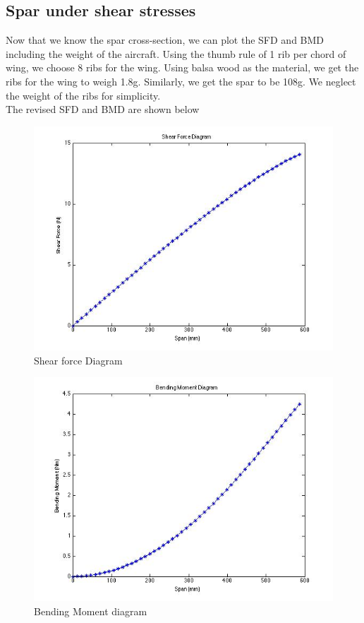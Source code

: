 \subsection{Spar under shear stresses}
Now that we know the spar cross-section, we can plot the SFD and BMD including the weight of the aircraft. 
Using the thumb rule of 1 rib per chord of wing, we choose 8 ribs for the wing. Using balsa wood as the material, we get the ribs for the wing to weigh 1.8g. Similarly, we get the spar to be 108g. We neglect the weight of the ribs for simplicity. 
\\
The revised SFD and BMD are shown below
\begin{figure}[H]
    \begin{center}
      \includegraphics[width=5.1in]{figures/sfdrev.jpg}
\caption{Shear force Diagram}
       \label{fig:SFDrev}
    \end{center}
\end{figure}
\begin{figure}[H]
    \begin{center}
      \includegraphics[width=5.1in]{figures/bmdrev.jpg}
\caption{Bending Moment diagram}
       \label{fig:BMDrev}
    \end{center}
\end{figure}

